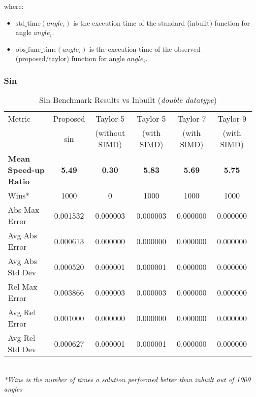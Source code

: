 \documentclass[12pt,twoside, letterpaper, margin=1in]{article}
\begin{document}
where:  
\begin{itemize}
    \item $\text{std\_time}(angle_i)$ is the execution time of the standard (inbuilt) function for angle $angle_i$.
    \item $\text{obs\_func\_time}(angle_i)$ is the execution time of the observed (proposed/taylor) function for angle $angle_i$.
\end{itemize}


\subsubsection{Sin}


\begin{table}[H]
  \centering
  \caption{Sin Benchmark Results vs Inbuilt (\textit{double datatype})}
  \small
  \begin{tabular}{lccccc}
    \toprule
    Metric & Proposed & Taylor-5 & Taylor-5 & Taylor-7 & Taylor-9 \\ 
           &    sin     & (without SIMD) & (with SIMD) & (with SIMD) & (with SIMD) \\
    \midrule
    \textbf{Mean Speed-up Ratio} & \textbf{5.49} & \textbf{0.30} & \textbf{5.83} & \textbf{5.69} & \textbf{5.75} \\
    Wins*                   & 1000   & 0          & 1000       & 1000       & 1000\\
    Abs Max Error          & 0.001532   & 0.000003   & 0.000003   & 0.000000   & 0.000000 \\
    Avg Abs Error          & 0.000613   & 0.000000   & 0.000000   & 0.000000   & 0.000000 \\
    Avg Abs Std Dev        & 0.000520   & 0.000001   & 0.000001   & 0.000000   & 0.000000 \\
    Rel Max Error          & 0.003866   & 0.000003   & 0.000003   & 0.000000   & 0.000000 \\
    Avg Rel Error          & 0.001000   & 0.000000   & 0.000000   & 0.000000   & 0.000000 \\
    Avg Rel Std Dev        & 0.000627   & 0.000001   & 0.000001   & 0.000000   & 0.000000 \\
    \bottomrule
  \end{tabular}
  \vspace{0mm} \\
  \hspace{-1.3cm} {\footnotesize \textit{*Wins is the number of times a solution performed better than inbuilt out of 1000 angles}}
  \label{tab:sine-transposed}
\end{table}
\end{document}

